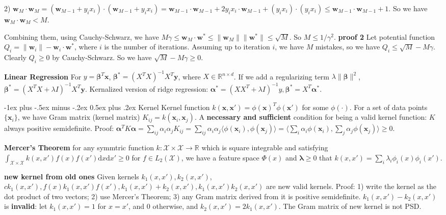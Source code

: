 \documentclass[10pt,landscape]{article}
\makeatletter
\newcommand{\vect}[1]{\boldsymbol{#1}}
\renewcommand{\section}{\@startsection{section}{1}{0mm}%
                                {-1ex plus -.5ex minus -.2ex}%
                                {0.5ex plus .2ex}%
                                {\normalfont\large\bfseries}}
\makeatother
\begin{document}
\begin{multicols}{3}
2) $\vect{w}_M \cdot \vect{w}_M = (\vect{w}_{M-1} + y_i x_i)\cdot (\vect{w}_{M-1} + y_i x_i) = \vect{w}_{M-1} \cdot \vect{w}_{M-1} + 2 y_i x_i \cdot \vect{w}_{M-1} + (y_i x_i) \cdot (y_i x_i) \leq  \vect{w}_{M-1} \cdot \vect{w}_{M-1} + 1$. So we have $\vect{w}_M \cdot \vect{w}_M < M$. 

Combining them, using Cauchy-Schwarz, we have $M\gamma \leq \vect{w}_M \cdot \vect{w}^* \leq \|\vect{w}_M\|  \|\vect{w}^*\| \leq \sqrt{M}$. So $M \leq 1/\gamma^2$.
\textbf{proof 2} Let potential function $Q_i = \|\vect{w}_i\| - \vect{w}_i \cdot \vect{w}^*$, where $i$ is the number of iterations. Assuming up to iteration $i$, we have $M$ mistakes, so we have $Q_i \leq \sqrt{M} - M\gamma$. Clearly $Q_i \geq 0$ by Cauchy-Schwarz. So we have $\sqrt{M} - M\gamma \geq 0$.

\textbf{Linear Regression} 
For $y = \vect{\beta}^T \vect{x}$, $\vect{\beta}^* = (X^T X)^{-1} X^T \vect{y}$, where $X \in \mathbb{R}^{n\times d}$. If we add a regularizing term $\lambda \|\vect{\beta}\|^2$, $\vect{\beta}^* = (X^T X + \lambda I)^{-1} X^T \vect{y}$. Kernalized version of ridge regression: $\vect{\alpha}^* = (X X^T + \lambda I )^{-1}y, \vect{\beta}^* = X^T \vect{\alpha}^*$.

\section{Kernel}
Kernel function $k(\vect{x},\vect{x}') = \phi(\vect{x})^T \phi(\vect{x}')$ for some $\phi(\cdot)$. For a set of data points $\{\vect{x}_i\} $, we have Gram matrix (kernel matrix) $K_{ij} = k(\vect{x}_i, \vect{x}_j)$. A \textbf{necessary and sufficient} condition for being a valid kernel function: $K$ always positive semidefinite. Proof: $\vect{\alpha}^T K \vect{\alpha} = \sum_{ij} \alpha_i \alpha_j K_{ij} = \sum_{ij} \alpha_i \alpha_j \langle \phi(\vect{x}_i), \phi(\vect{x}_j) \rangle = \langle \sum_i \alpha_i \phi(\vect{x}_i),  \sum_j \alpha_j \phi(\vect{x}_j) \rangle \geq 0$.

\textbf{Mercer's Theorem} for any symmtric function $k: \mathcal{X} \times \mathcal{X} \rightarrow \mathbb{R}$ which is square integrable and satisfying $\int_{\mathcal{X} \times \mathcal{X}} k(x,x') f(x) f(x') \mathrm{d}x \mathrm{d}x' \geq 0$ for $f \in L_2(\mathcal{X})$, we have a feature space $\Phi(x)$ and $\vect{\lambda} \geq 0 $ that $k(x,x') = \sum_i \lambda_i \phi_i(x) \phi_i(x')$.

\textbf{new kernel from old ones} Given kernels $k_1(x,x'), k_2(x,x')$,  $ck_1(x,x'), f(x)k_1(x,x')f(x'), k_1(x,x')+k_2(x,x'), k_1(x,x')k_2(x,x')$ are new valid kernels. Proof: 1) write the kernel as the dot product of two vectors; 2) use Mercer's Theorem; 3) any Gram matrix derived from it is positive semidefinite. $k_1(x,x')-k_2(x,x')$ is \textbf{invalid}: let $k_1(x,x')= 1$ for $x=x'$, and $0$ otherwise, and $k_2(x,x') = 2k_1(x,x')$. The Gram matrix of new kernel is not PSD. 


\end{multicols}
\end{document}
